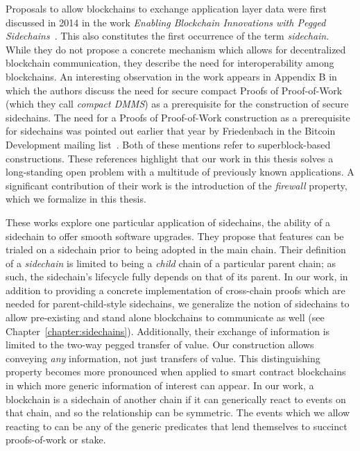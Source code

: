 Proposals to allow blockchains to exchange application layer data were first
discussed in 2014 in the work
\emph{Enabling Blockchain Innovations with Pegged Sidechains}~\cite{sidechains}.
This also constitutes the first occurrence of the term \emph{sidechain}. While
they do not propose a concrete mechanism which allows for decentralized
blockchain communication, they describe the need for interoperability among
blockchains. An interesting observation in the work appears in Appendix B in
which the authors discuss the need for secure compact Proofs of Proof-of-Work
(which they call \emph{compact DMMS}) as a prerequisite for the construction of
secure sidechains. The need for a Proofs of Proof-of-Work construction as a
prerequisite for sidechains was pointed out earlier that year by
Friedenbach in the Bitcoin Development mailing list~\cite{friedenbach}. Both of
these mentions refer to superblock-based constructions. These references
highlight that our work in this thesis solves a long-standing open problem with
a multitude of previously known applications.  A significant
contribution of their work is the introduction of the \emph{firewall} property,
which we formalize in this thesis.

These works explore one particular application of sidechains, the ability of a
sidechain to offer smooth software upgrades. They propose that features can be
trialed on a sidechain prior to being adopted in the main chain. Their
definition of a \emph{sidechain} is limited to being a \emph{child} chain of a
particular parent chain; as such, the sidechain's lifecycle fully depends on
that of its parent. In our work, in addition to providing a concrete
implementation of cross-chain proofs which are needed for parent-child-style
sidechains, we generalize the notion of sidechains to allow pre-existing and
stand alone blockchains to communicate as well (see
Chapter~\ref{chapter:sidechains}). Additionally, their exchange of information
is limited to the two-way pegged transfer of value. Our construction allows
conveying \emph{any} information, not just transfers of value. This
distinguishing property becomes more pronounced when applied to smart contract
blockchains in which more generic information of interest can appear. In our
work, a blockchain is a sidechain of another chain if it can generically react
to events on that chain, and so the relationship can be symmetric. The events
which we allow reacting to can be any of the generic predicates that lend
themselves to succinct proofs-of-work or stake.


